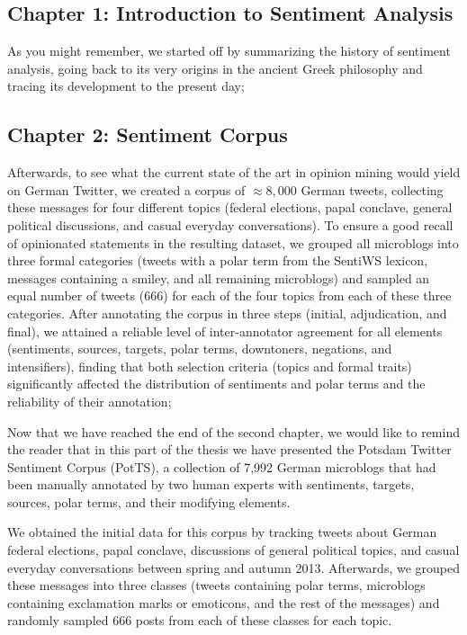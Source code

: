 \documentclass[11pt]{article}
\begin{document}
\subsection{Chapter 1: Introduction to Sentiment Analysis}
As you might remember, we started off by summarizing the history of
sentiment analysis, going back to its very origins in the ancient
Greek philosophy and tracing its development to the present day;


\subsection{Chapter 2: Sentiment Corpus}

Afterwards, to see what the current state of the art in opinion mining
would yield on German Twitter, we created a corpus of $\approx8,000$
German tweets, collecting these messages for four different topics
(federal elections, papal conclave, general political discussions, and
casual everyday conversations).  To ensure a good recall of
opinionated statements in the resulting dataset, we grouped all
microblogs into three formal categories (tweets with a polar term from
the SentiWS lexicon, messages containing a smiley, and all remaining
microblogs) and sampled an equal number of tweets (666) for each of
the four topics from each of these three categories.  After annotating
the corpus in three steps (initial, adjudication, and final), we
attained a reliable level of inter-annotator agreement for all
elements (sentiments, sources, targets, polar terms, downtoners,
negations, and intensifiers), finding that both selection criteria
(topics and formal traits) significantly affected the distribution of
sentiments and polar terms and the reliability of their annotation;

Now that we have reached the end of the second chapter, we would like
to remind the reader that in this part of the thesis we have presented
the Potsdam Twitter Sentiment Corpus (PotTS), a collection of 7,992
German microblogs that had been manually annotated by two human
experts with sentiments, targets, sources, polar terms, and their
modifying elements.

We obtained the initial data for this corpus by tracking tweets about
German federal elections, papal conclave, discussions of general
political topics, and casual everyday conversations between spring and
autumn 2013.  Afterwards, we grouped these messages into three classes
(tweets containing polar terms, microblogs containing exclamation
marks or emoticons, and the rest of the messages) and randomly sampled
666 posts from each of these classes for each topic.
\end{document}

